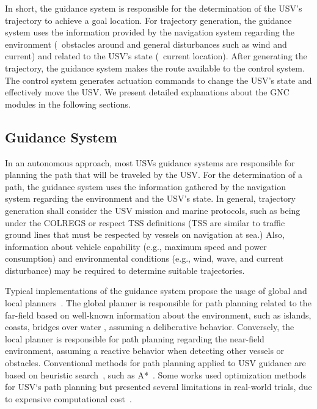     In short, the guidance system is responsible for the determination of the \ac{USV}'s trajectory to achieve a goal location. For trajectory generation, the guidance system uses the information provided by the navigation system regarding the environment (\eg~obstacles around and general disturbances such as wind and current) and related to the \ac{USV}'s state (\eg~current location). After generating the trajectory, the guidance system makes the route available to the control system. The control system generates actuation commands to change the \ac{USV}'s state and effectively move the \ac{USV}. We present detailed explanations about the \ac{GNC} modules in the following sections.
    
    \subsection{Guidance System}
    
    In an autonomous approach, most \acp{USV} guidance systems are responsible for planning the path that will be traveled by the \ac{USV}. For the determination of a path, the guidance system uses the information gathered by the navigation system regarding the environment and the \ac{USV}'s state. In general, trajectory generation shall consider the \ac{USV} mission and marine protocols, such as being under the \ac{COLREGS} or respect \ac{TSS} definitions (\ac{TSS} are similar to traffic ground lines that must be respected by vessels on navigation at sea.) Also, information about vehicle capability (e.g., maximum speed and power consumption) and environmental conditions (e.g., wind, wave, and current disturbance) may be required to determine suitable trajectories.
    
    Typical implementations of the guidance system propose the usage of global and local planners~\cite{Liu2016Unmanned}. The global planner is responsible for path planning related to the far-field based on well-known information about the environment, such as islands, coasts, bridges over water \etc, assuming a deliberative behavior. Conversely, the local planner is responsible for path planning regarding the near-field environment, assuming a reactive behavior when detecting other vessels or obstacles. Conventional methods for path planning applied to \ac{USV} guidance are based on heuristic search~\cite{Liu2016Unmanned}, such as A*~\cite{Larson2006Autonomous, Naus2013Idea}. Some works used optimization methods for \ac{USV}`s path planning but presented several limitations in real-world trials, due to expensive computational cost~\cite{Svec2011Trajectory, Campbell2013Automatic}.


